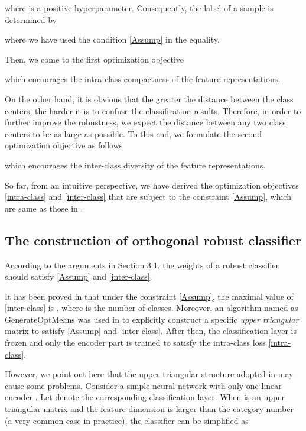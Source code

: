 \documentclass[preprint,review,12pt]{elsarticle}
\numberwithin{equation}{section}
\begin{document}
     where  is a positive hyperparameter.
     Consequently, the label of a sample   is determined by
	
	where we have used the condition \eqref{Assump} in the equality.


	Then, we come to  the first optimization objective
	
    which encourages the intra-class compactness of the  feature representations.

   On the other hand,
   it is obvious that the greater the distance between the class centers,  the harder it  is to confuse the classification results.
   Therefore, in order to further improve the robustness,
   we expect the distance between any two class centers to be as large as possible.
   To this end, we formulate the second optimization objective as follows
   	
   which encourages the inter-class diversity of the feature representations.


   So far,  from an intuitive perspective,
   we have derived the optimization objectives \eqref{intra-class} and \eqref{inter-class} that are subject to the constraint \eqref{Assump},
   which  are same as those in \cite{pang2018,pang2020}.
	
	
\subsection{The construction of orthogonal robust classifier}
\label{sec:construction}
According to the arguments in Section 3.1,
the weights of a robust classifier should satisfy \eqref{Assump} and \eqref{inter-class}.
	
It has been proved in  \cite{pang2018} that under the constraint  \eqref{Assump},
the maximal value of \eqref{inter-class} is  ,
where  is the number of classes.
Moreover,
an algorithm named as GenerateOptMeans was used in  \cite{pang2018,pang2020}
to explicitly construct a specific \emph{upper triangular} matrix  to satisfy \eqref{Assump} and \eqref{inter-class}.
After then, the classification layer is frozen  and only the encoder part is trained to satisfy the intra-class loss \eqref{intra-class}.

However, we point out here that the upper triangular structure adopted in \cite{pang2018,pang2020} may cause some problems.
Consider a simple neural network with only one linear encoder .
Let  denote the corresponding classification layer.
When    is an upper triangular matrix and the feature dimension  is larger than the category number  (a very common case in practice),
the classifier can be simplified as
\end{document}

